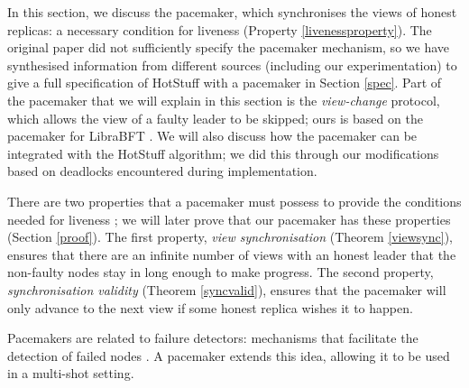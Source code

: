 In this section, we discuss the pacemaker, which synchronises the views of honest replicas: a necessary condition for liveness (Property \ref{livenessproperty}). The original paper did not sufficiently specify the pacemaker mechanism, so we have synthesised information from different sources (including our experimentation) to give a full specification of HotStuff with a pacemaker in Section \ref{spec}. Part of the pacemaker that we will explain in this section is the \textit{view-change} protocol, which allows the view of a faulty leader to be skipped; ours is based on the pacemaker for LibraBFT \cite{baudetStateMachineReplication2019, ittai}. We will also discuss how the pacemaker can be integrated with the HotStuff algorithm; we did this through our modifications based on deadlocks encountered during implementation.


There are two properties that a pacemaker must possess to provide the conditions needed for liveness \cite{naorCogsworthByzantineView2021}; we will later prove that our pacemaker has these properties (Section \ref{proof}). The first property, \textit{view synchronisation} (Theorem \ref{viewsync}), ensures that there are an infinite number of views with an honest leader that the non-faulty nodes stay in long enough to make progress. The second property, \textit{synchronisation validity} (Theorem \ref{syncvalid}), ensures that the pacemaker will only advance to the next view if some honest replica wishes it to happen.

Pacemakers are related to failure detectors: mechanisms that facilitate the detection of failed nodes \cite{chandraWeakestFailureDetector1996,chandraUnreliableFailureDetectors1996}. A pacemaker extends this idea, allowing it to be used in a multi-shot setting.


